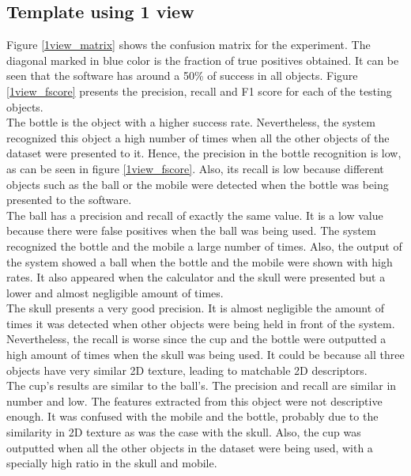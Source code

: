 	\subsection{Template using 1 view}
	Figure \ref{1view_matrix} shows the confusion matrix for the experiment. 
	The diagonal marked in blue color is the fraction of true positives obtained. 
	It can be seen that the software has around a 50\% of success in all objects. 
	Figure \ref{1view_fscore} presents the precision, recall and F1 score for each of the testing objects. 
	\\

	The bottle is the object with a higher success rate. 
	Nevertheless, the system recognized this object a high number of times when all the other objects of the dataset were presented to it. 
	Hence, the precision in the bottle recognition is low, as can be seen in figure \ref{1view_fscore}.
	Also, its recall is low because different objects such as the ball or the mobile were detected when the bottle was being presented to the software.  
	\\

	The ball has a precision and recall of exactly the same value. 
	It is a low value because there were false positives when the ball was being used. 
	The system recognized the bottle and the mobile a large number of times. 
	Also, the output of the system showed a ball when the bottle and the mobile were shown with high rates. 
	It also appeared when the calculator and the skull were presented but a lower and almost negligible amount of times. 
	\\

	The skull presents a very good precision. 
	It is almost negligible the amount of times it was detected when other objects were being held in front of the system. 
	Nevertheless, the recall is worse since the cup and the bottle were outputted a high amount of times when the skull was being used. 
	It could be because all three objects have very similar 2D texture, leading to matchable 2D descriptors. 
	\\

	The cup's results are similar to the ball's. 
	The precision and recall are similar in number and low. 
	The features extracted from this object were not descriptive enough.
	It was confused with the mobile and the bottle, probably due to the similarity in 2D texture as was the case with the skull. 
	Also, the cup was outputted when all the other objects in the dataset were being used, with a specially high ratio in the skull and mobile. 
	\\


